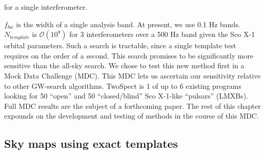 \noindent for a single interferometer. 

$f_{bw}$ is the width of a single analysis band. 
At present, we use 0.1 Hz bands.
$N_{template}$ is $\mathcal{O}(10^{8})$ for 3 interferometers over a 500 Hz band given the Sco X-1 orbital parameters.
Such a search is tractable, since a single template test requires on the order of a second.
This search promises to be significantly more sensitive than the all-sky search.
We chose to test this new method first in a Mock Data Challenge (MDC).
This MDC lets us ascertain our sensitivity relative to other GW-search algorithms.
TwoSpect is 1 of up to 6 existing programs looking for 50 ``open'' and 50 ``closed/blind'' Sco X-1-like ``pulsars'' (LMXBs).
Full MDC results are the subject of a forthcoming paper.
The rest of this chapter expounds on the development and testing of methods in the course of this MDC.


\subsection{Sky maps using exact templates}

